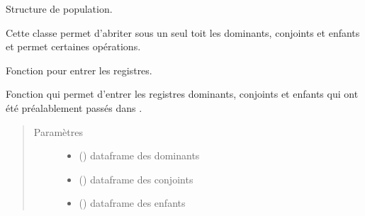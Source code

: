 \documentclass[letterpaper,10pt,french]{sphinxmanual}
\begin{document}

\begin{fulllineitems}
\label{\detokenize{code:simgen.population}}
Structure de population.

Cette classe permet d’abriter sous un seul toit les dominants, conjoints et enfants et permet certaines opérations.

\begin{fulllineitems}
\label{\detokenize{code:simgen.population.input}}
Fonction pour entrer les registres.

Fonction qui permet d’entrer les registres dominants, conjoints et enfants qui ont été préalablement passés dans .
\begin{quote}\begin{description}
\item[{Paramètres}] \leavevmode\begin{itemize}
\item {} 
 () \textendash{} dataframe des dominants

\item {} 
 () \textendash{} dataframe des conjoints

\item {} 
 () \textendash{} dataframe des enfants

\end{itemize}

\end{description}\end{quote}

\end{fulllineitems}


\end{fulllineitems}
\end{document}
